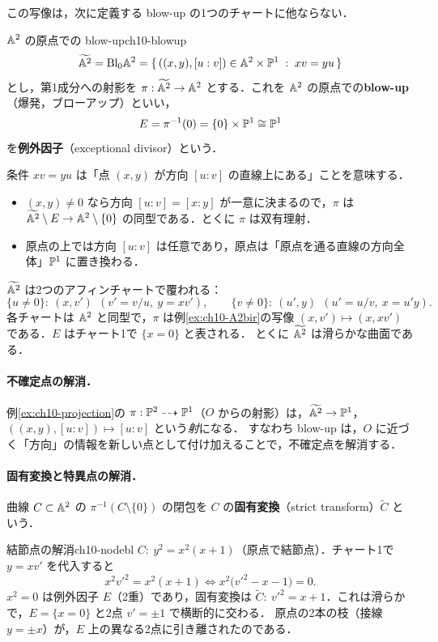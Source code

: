 この写像は，次に定義する blow-up の1つのチャートに他ならない．

\begin{mydef}{$\mathbb{A}^2$ の原点での blow-up}{ch10-blowup}
\[
  \widetilde{\mathbb{A}^2}=\mathrm{Bl}_0\mathbb{A}^2=\{\,((x,y),[u:v])\in\mathbb{A}^2\times\mathbb{P}^1 \;:\; xv=yu\,\}
\]
とし，第1成分への射影を $\pi:\widetilde{\mathbb{A}^2}\to\mathbb{A}^2$ とする．これを $\mathbb{A}^2$ の原点での\textbf{blow-up}（爆発，ブローアップ）といい，
\[
  E=\pi^{-1}(0)=\{0\}\times\mathbb{P}^1\cong\mathbb{P}^1
\]
を\textbf{例外因子}（exceptional divisor）という．
\end{mydef}

条件 $xv=yu$ は「点 $(x,y)$ が方向 $[u:v]$ の直線上にある」ことを意味する．
\begin{itemize}
  \item $(x,y)\neq0$ なら方向 $[u:v]=[x:y]$ が一意に決まるので，$\pi$ は $\widetilde{\mathbb{A}^2}\setminus E\to\mathbb{A}^2\setminus\{0\}$ の同型である．とくに $\pi$ は双有理射．
  \item 原点の上では方向 $[u:v]$ は任意であり，原点は「原点を通る直線の方向全体」$\mathbb{P}^1$ に置き換わる．
\end{itemize}
$\widetilde{\mathbb{A}^2}$ は2つのアフィンチャートで覆われる：
\[
  \{u\neq0\}:\ (x,v')\ \ (v'=v/u,\ y=xv'),\qquad \{v\neq0\}:\ (u',y)\ \ (u'=u/v,\ x=u'y).
\]
各チャートは $\mathbb{A}^2$ と同型で，$\pi$ は例\ref{ex:ch10-A2bir}の写像 $(x,v')\mapsto(x,xv')$ である．$E$ はチャート1で $\{x=0\}$ と表される．
とくに $\widetilde{\mathbb{A}^2}$ は滑らかな曲面である．

\paragraph{不確定点の解消．}
例\ref{ex:ch10-projection}の $\pi:\mathbb{P}^2\dashrightarrow\mathbb{P}^1$（$O$ からの射影）は，$\widetilde{\mathbb{A}^2}\to\mathbb{P}^1$，$((x,y),[u:v])\mapsto[u:v]$ という\emph{射}になる．
すなわち blow-up は，$O$ に近づく「方向」の情報を新しい点として付け加えることで，不確定点を解消する．

\paragraph{固有変換と特異点の解消．}
曲線 $C\subset\mathbb{A}^2$ の $\pi^{-1}(C\setminus\{0\})$ の閉包を $C$ の\textbf{固有変換}（strict transform）$\widetilde C$ という．

\begin{myex}{結節点の解消}{ch10-nodebl}
$C:\ y^2=x^2(x+1)$（原点で結節点）．チャート1で $y=xv'$ を代入すると
\[
  x^2v'^2=x^2(x+1)\iff x^2\bigl(v'^2-x-1\bigr)=0.
\]
$x^2=0$ は例外因子 $E$（2重）であり，固有変換は $\widetilde C:\ v'^2=x+1$．これは滑らかで，$E=\{x=0\}$ と2点 $v'=\pm1$ で横断的に交わる．
原点の2本の枝（接線 $y=\pm x$）が，$E$ 上の異なる2点に引き離されたのである．
\end{myex}

